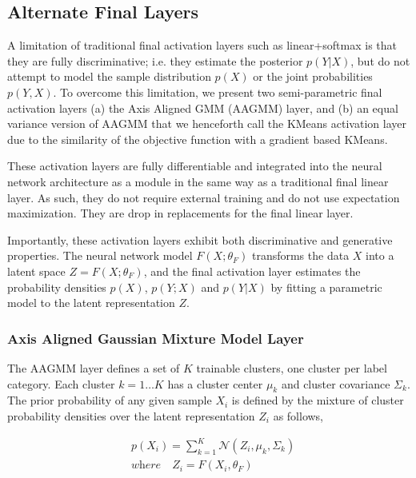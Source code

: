 \documentclass[10pt,twocolumn,letterpaper]{article}
\begin{document}
\subsection{Alternate Final Layers}

A limitation of traditional final activation layers such as linear+softmax is that they are fully discriminative; i.e. they estimate the posterior $p(Y|X)$, but do not attempt to model the sample distribution $p(X)$ or the joint probabilities $p(Y,X)$. 
To overcome this limitation, we present two semi-parametric final activation layers (a) the Axis Aligned GMM (AAGMM) layer, and (b) an equal variance version of AAGMM that we henceforth call the KMeans activation layer due to the similarity of the objective function with a gradient based KMeans.

These activation layers are fully differentiable and integrated into the neural network architecture as a module in the same way as a traditional final linear layer. 
As such, they do not require external training and do not use expectation maximization.
They are drop in replacements for the final linear layer.

Importantly, these activation layers exhibit both discriminative and generative properties. 
The neural network model $F(X;\theta_F)$ transforms the data $X$ into a latent space $Z = F(X;\theta_F)$, and the final activation layer estimates the probability densities $p(X)$, $p(Y;X)$ and $p(Y|X)$ by fitting a parametric model to the latent representation $Z$.

\subsubsection{Axis Aligned Gaussian Mixture Model Layer}

The AAGMM layer defines a set of $K$ trainable clusters, one cluster per label category. 
Each cluster $k=1 \dots K$ has a cluster center $\mu_k$ and cluster covariance $\Sigma_k$. 
The prior probability of any given sample $X_i$ is defined by the mixture of cluster probability densities over the latent representation $Z_i$ as follows,

\begin{equation}
	\begin{aligned}
		\label{eq_px}
		&p(X_i) = \sum_{k=1}^K \mathcal{N} (Z_i, \mu_{k}, \Sigma_k)
		\\[10pt]
		&\textit{where} \quad Z_i = F(X_i, \theta_F)
	\end{aligned}
\end{equation}
\end{document}
